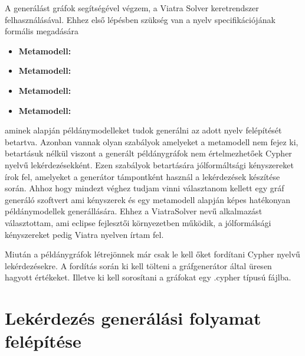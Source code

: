  

 
A generálást gráfok segítségével végzem,  a Viatra Solver keretrendszer felhasználásával. Ehhez első lépésben
szükség van a nyelv specifikációjának formális megadására
\begin{itemize}
	\item \textbf{Metamodell:} 
	\item \textbf{Metamodell:} 
	\item \textbf{Metamodell:} 
	\item \textbf{Metamodell:} 
\end{itemize}


aminek alapján példánymodelleket tudok generálni az adott nyelv felépítését betartva. Azonban vannak 
olyan szabályok amelyeket a metamodell nem fejez ki, betartásuk nélkül viszont a generált példánygráfok
nem értelmezhetőek Cypher nyelvű lekérdezésekként. Ezen szabályok betartására jólformáltsági kényszereket 
írok fel, amelyeket a generátor támpontként használ a lekérdezések készítése során. Ahhoz hogy mindezt 
véghez tudjam vinni választanom kellett egy gráf generáló szoftvert ami kényszerek és egy metamodell
alapján képes hatékonyan példánymodellek generállására. Ehhez a ViatraSolver nevű alkalmazást választottam,
ami eclipse fejlesztői környezetben működik, a jólformálsági kényszereket pedig Viatra nyelven írtam fel.

Miután a példánygráfok létrejönnek már csak le kell őket fordítani Cypher nyelvű lekérdezésekre.
A fordítás során ki kell tölteni a gráfgenerátor által üresen hagyott értékeket. Illetve ki kell sorosítani a
gráfokat egy .cypher típusú fájlba.  
  

\section{Lekérdezés generálási folyamat felépítése}

